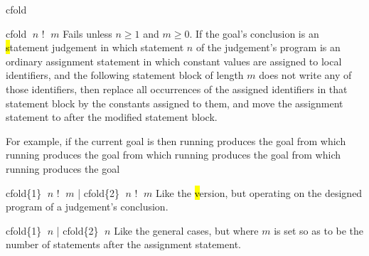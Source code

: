 \begin{tactic}{cfold}
  \begin{tsyntax}{cfold $\;n$ ! $\;m$}
    Fails unless $n\geq 1$ and $m\geq 0$.  If the goal's conclusion is
    an \hl statement judgement in which statement $n$ of the
    judgement's program is an ordinary assignment statement in which
    constant values are assigned to local identifiers, and the
    following statement block of length $m$ does not write any of
    those identifiers, then replace all occurrences of the assigned
    identifiers in that statement block by the constants assigned to
    them, and move the assignment statement to after the modified
    statement block.

    \medskip For example, if the current goal is
     then
    running 
    produces the goal
    from which
    running 
    produces the goal
    from which
    running 
    produces the goal
    from which
    running 
    produces the goal
  \end{tsyntax}

  \begin{tsyntax}{cfold\{1\} $\;n$ ! $\;m$ | cfold\{2\} $\;n$ ! $\;m$}
    Like the \hl version, but operating on the designed program of
    a \prhl judgement's conclusion.
  \end{tsyntax}

  \begin{tsyntax}{cfold\{1\} $\;n$ | cfold\{2\} $\;n$}
    Like the general cases, but where $m$ is set so as to be the
    number of statements after the assignment statement.
  \end{tsyntax}
\end{tactic}
